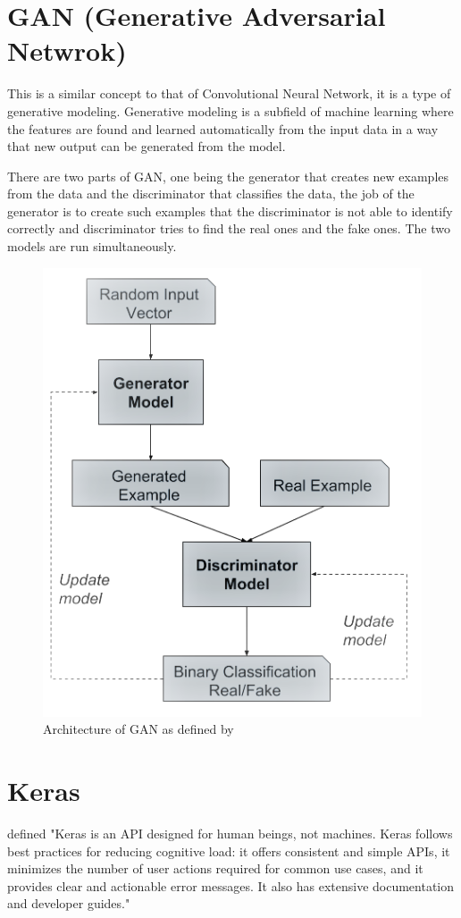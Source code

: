 \documentclass[oneside,12pt]{Classes/RoboticsLaTeX}
\begin{document}
\section{GAN (Generative Adversarial Netwrok)}


This is a similar concept to that of Convolutional Neural Network, it is a type of generative modeling. Generative modeling is a subfield of machine learning where the features are found and learned automatically from the input data in a way that new output can be generated from the model.

There are two parts of GAN, one being the generator that creates new examples from the data and the discriminator that classifies the data, the job of the generator is to create such examples that the discriminator is not able to identify correctly and discriminator tries to find the real ones and the fake ones. The two models are run simultaneously.

\begin{figure}[H]
  \centering
  \includegraphics[width=0.5\linewidth]{Figures/gan.png}
  \caption{Architecture of GAN as defined by \cite{brownlee_2019}}
  \label{fig:gan}
\end{figure}

\section{Keras}

\cite{keras} defined "Keras is an API designed for human beings, not machines. Keras follows best practices for reducing cognitive load: it offers consistent and simple APIs, it minimizes the number of user actions required for common use cases, and it provides clear and actionable error messages. It also has extensive documentation and developer guides."
\end{document}
